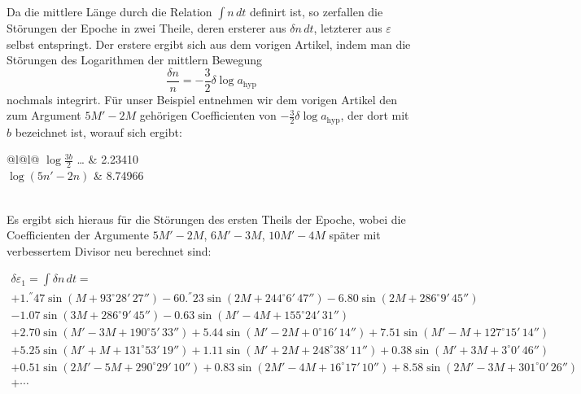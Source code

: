 \documentclass[12pt,a4paper]{article}
\begin{document}
Da die mittlere Länge durch die Relation $\int n \, dt$ definirt ist, so zerfallen die Störungen der Epoche in zwei Theile, deren ersterer aus $\delta n \, dt$, letzterer aus $\varepsilon$ selbst entspringt. Der erstere ergibt sich aus dem vorigen Artikel, indem man die Störungen des Logarithmen der mittlern Bewegung
\[\frac{\delta n}{n} = -\frac{3}{2} \delta \log a_{\text{hyp}}\]
nochmals integrirt. Für unser Beispiel entnehmen wir dem vorigen Artikel den zum Argument $5M' - 2M$ gehörigen Coefficienten von $-\frac{3}{2} \delta \log a_{\text{hyp}}$, der dort mit $b$ bezeichnet ist, worauf sich ergibt:

\begin{center}
\begin{tabular}{@{}l@{\quad}l@{}}
$\log \frac{3b}{2}$ \ldots{} & 2.23410\\
$\log(5n' - 2n)$ & 8.74966\\
\\
\end{tabular}
\end{center}

Es ergibt sich hieraus für die Störungen des ersten Theils der Epoche, wobei die Coefficienten der Argumente $5M' - 2M$, $6M' - 3M$, $10M' - 4M$ später mit verbessertem Divisor neu berechnet sind:

\begin{multline*}
\delta \varepsilon_1 = \int \delta n \, dt =\\
+1.^{''}47 \sin(M + 93^{\circ} 28'\, 27'') - 60.^{''}23 \sin(2M + 244^{\circ} 6'\, 47'') - 6.80 \sin(2M + 286^{\circ} 9'\, 45'')\\
-1.07 \sin(3M + 286^{\circ} 9'\, 45'') - 0.63 \sin(M' - 4M + 155^{\circ} 24'\, 31'')\\
+2.70 \sin(M' - 3M + 190^{\circ} 5'\, 33'') + 5.44 \sin(M' - 2M + 0^{\circ} 16'\, 14'') + 7.51 \sin(M' - M + 127^{\circ} 15'\, 14'')\\
+5.25 \sin(M' + M + 131^{\circ} 53'\, 19'') + 1.11 \sin(M' + 2M + 248^{\circ} 38'\, 11'') + 0.38 \sin(M' + 3M + 3^{\circ} 0'\, 46'')\\
+0.51 \sin(2M' - 5M + 290^{\circ} 29'\, 10'') + 0.83 \sin(2M' - 4M + 16^{\circ} 17'\, 10'') + 8.58 \sin(2M' - 3M + 301^{\circ} 0'\, 26'')\\
+ \cdots
\end{multline*}

\begin{center}
\end{center}
\end{document}
